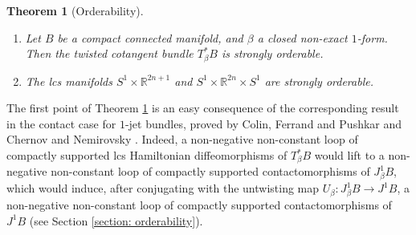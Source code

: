 \documentclass{amsart}
\newtheorem{thm}{Theorem}[section]
\theoremstyle{remark}
\begin{document}
\begin{thm}[Orderability]\label{theorem: orderability - intro}
\renewcommand{\theenumi}{\roman{enumi}}\
\begin{enumerate}
\item Let $B$ be a compact connected manifold,
and $\beta$ a closed non-exact $1$-form.
Then the twisted cotangent bundle $T_{\beta}^{\ast}B$
is strongly orderable.
\item The lcs manifolds $S^1 \times \mathbb{R}^{2n+1}$
and $S^1 \times \mathbb{R}^{2n} \times S^1$
are strongly orderable.
\end{enumerate}
\end{thm}

The first point of Theorem \ref{theorem: orderability - intro} 
is an easy consequence of the corresponding result
in the contact case for $1$-jet bundles,
proved by Colin, Ferrand and Pushkar \cite{CFP}
and Chernov and Nemirovsky \cite{CN}.
Indeed,
a non-negative non-constant loop
of compactly supported lcs Hamiltonian diffeomorphisms of  $T_{\beta}^{\ast}B$
would lift to a non-negative non-constant loop
of compactly supported contactomorphisms of  $J_{\beta}^1B$,
which would induce,
after conjugating with the untwisting map
$U_{\beta}: J^1_{\beta} B\rightarrow J^1B$,
a non-negative non-constant loop of compactly supported contactomorphisms of  $J^1B$
(see Section \ref{section: orderability}).
\end{document}
